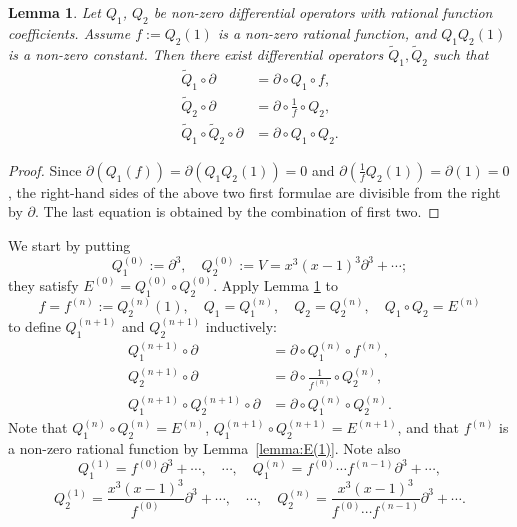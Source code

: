 \documentclass[a4paper,12pt]{article}
\newtheorem{lemma}[thm]{Lemma}
\theoremstyle{definition}
\theoremstyle{remark}
\numberwithin{equation}{section} %
\begin{document}
\begin{lemma}\label{LetQ1Q2}
  Let $Q_1$, $Q_2$ be non-zero differential operators
  with rational function coefficients.
Assume $f:=Q_2(1)$ is a non-zero rational function, and $Q_1 Q_2(1)$ is a non-zero constant.
Then there exist differential operators $\tilde{Q}_1, \tilde{Q}_2$ such that
\begin{align*} 
\tilde{Q}_1 \circ \partial &=\partial \circ Q_1 \circ f, \\
\tilde{Q}_2 \circ \partial &=\partial \circ \frac1{f} \circ Q_2, \\
\tilde{Q}_1 \circ \tilde{Q}_2 \circ \partial &=\partial \circ Q_1 \circ Q_2.
\end{align*}
\end{lemma}
\begin{proof}
Since $\partial(Q_1 (f)) = \partial(Q_1 Q_2(1))=0$
and $\partial(\frac1{f} Q_2(1)) = \partial(1)=0$, 
the right-hand sides of the above two first formulae are divisible from the right by $\partial$.
The last equation is obtained by the combination of first two.
\end{proof} %

We start by putting
$$Q_1^{(0)}:=\partial^3,\quad Q_2^{(0)}:=V=x^3(x-1)^3\partial^3+\cdots;$$
they satisfy $E^{(0)}=Q_1^{(0)}\circ Q_2^{(0)}$.
Apply Lemma \ref{LetQ1Q2} to
$$f=f^{(n)}:=Q_2^{(n)}(1),\quad Q_1=Q_1^{(n)},\quad Q_2=Q_2^{(n)},\quad Q_1\circ Q_2=E^{(n)}$$
to define  $Q_1^{(n+1)}$ and $Q_2^{(n+1)}$ inductively:
\begin{equation}\label{Q1Q2}
  \begin{aligned} 
 Q_1^{(n+1)}\circ \partial &=\partial\circ Q_1^{(n)}\circ f^{(n)},\\
 Q_2^{(n+1)}\circ \partial &=\partial\circ\frac1{f^{(n)}}\circ Q_2^{(n)},\\
 Q_1^{(n+1)}\circ Q_2^{(n+1)}\circ\partial&=\partial\circ Q_1^{(n)}\circ Q_2^{(n)}.
  \end{aligned}
\end{equation}%
Note that $Q_1^{(n)}\circ Q_2^{(n)}= E^{(n)}$, $Q_1^{(n+1)}\circ Q_2^{(n+1)}= E^{(n+1)}$,
and that $f^{(n)}$ is a non-zero rational function by Lemma~\ref{lemma:E(1)}.
Note also
$$Q_1^{(1)}=f^{(0)}\partial^3+\cdots,\quad \cdots,
\quad Q_1^{(n)}=f^{(0)}\cdots f^{(n-1)}\partial^3+\cdots,$$
$$Q_2^{(1)}=\frac{x^3(x-1)^3}{f^{(0)}}\partial^3+\cdots,\quad \cdots,
\quad Q_2^{(n)}=\frac{x^3(x-1)^3}{f^{(0)}\cdots f^{(n-1)}}\partial^3+\cdots.$$
\end{document}
